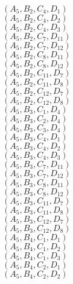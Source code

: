 \documentclass[14pt]{article}
\begin{document}
    $({A}_{5}, {B}_{2}, {C}_{4}, {D}_{1}) $ \\ 
    $({A}_{5}, {B}_{2}, {C}_{4}, {D}_{2}) $ \\ 
    $({A}_{5}, {B}_{2}, {C}_{4}, {D}_{3}) $ \\ 
    $({A}_{5}, {B}_{2}, {C}_{7}, {D}_{11}) $ \\ 
    $({A}_{5}, {B}_{2}, {C}_{7}, {D}_{12}) $ \\ 
    $({A}_{5}, {B}_{2}, {C}_{8}, {D}_{11}) $ \\ 
    $({A}_{5}, {B}_{2}, {C}_{8}, {D}_{12}) $ \\ 
    $({A}_{5}, {B}_{2}, {C}_{11}, {D}_{7}) $ \\ 
    $({A}_{5}, {B}_{2}, {C}_{11}, {D}_{8}) $ \\ 
    $({A}_{5}, {B}_{2}, {C}_{12}, {D}_{7}) $ \\ 
    $({A}_{5}, {B}_{2}, {C}_{12}, {D}_{8}) $ \\ 
    $({A}_{5}, {B}_{3}, {C}_{1}, {D}_{4}) $ \\ 
    $({A}_{5}, {B}_{3}, {C}_{2}, {D}_{4}) $ \\ 
    $({A}_{5}, {B}_{3}, {C}_{3}, {D}_{4}) $ \\ 
    $({A}_{5}, {B}_{3}, {C}_{4}, {D}_{1}) $ \\ 
    $({A}_{5}, {B}_{3}, {C}_{4}, {D}_{2}) $ \\ 
    $({A}_{5}, {B}_{3}, {C}_{4}, {D}_{3}) $ \\ 
    $({A}_{5}, {B}_{3}, {C}_{7}, {D}_{11}) $ \\ 
    $({A}_{5}, {B}_{3}, {C}_{7}, {D}_{12}) $ \\ 
    $({A}_{5}, {B}_{3}, {C}_{8}, {D}_{11}) $ \\ 
    $({A}_{5}, {B}_{3}, {C}_{8}, {D}_{12}) $ \\ 
    $({A}_{5}, {B}_{3}, {C}_{11}, {D}_{7}) $ \\ 
    $({A}_{5}, {B}_{3}, {C}_{11}, {D}_{8}) $ \\ 
    $({A}_{5}, {B}_{3}, {C}_{12}, {D}_{7}) $ \\ 
    $({A}_{5}, {B}_{3}, {C}_{12}, {D}_{8}) $ \\ 
    $({A}_{5}, {B}_{4}, {C}_{1}, {D}_{1}) $ \\ 
    $({A}_{5}, {B}_{4}, {C}_{1}, {D}_{2}) $ \\ 
    $({A}_{5}, {B}_{4}, {C}_{1}, {D}_{3}) $ \\ 
    $({A}_{5}, {B}_{4}, {C}_{2}, {D}_{1}) $ \\ 
    $({A}_{5}, {B}_{4}, {C}_{2}, {D}_{2}) $ \\ 
\end{document}
